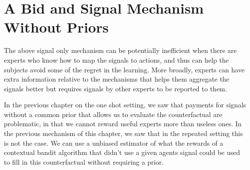 

	




\section{A Bid and Signal Mechanism Without Priors}



The above signal only mechanism can be potentially inefficient when there are experts who know how to map the signals to actions, and thus can help the subjects avoid some of the regret in the learning.
More broadly, experts can have extra information relative to the mechanisms that helps them aggregate the signals better but requires signals by other experts to be reported to them. 

In the previous chapter on the one shot setting, we saw that payments for  signals without a common prior that allows us to evaluate the counterfactual are problematic, in that we cannot reward useful experts more than useless ones. In the previous mechanism of this chapter, we saw that in the repeated setting this is not the case. We can use a unbiased estimator of what the rewards of a contextual bandit algorithm that didn't use a given agents signal could be used to fill in this counterfactual without requiring a prior.

